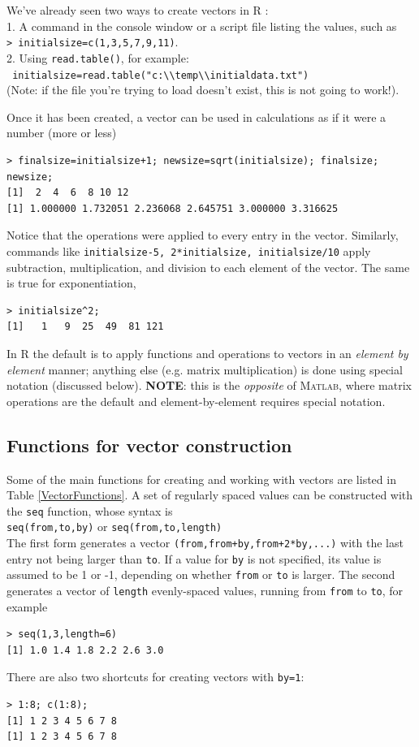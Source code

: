 \documentclass [11pt]{article}
\newcommand{\blst}{\vspace{-0.035in} \begin{lstlisting}}
\newcommand{\ttt}[1]{\texttt{#1}}
\numberwithin{exercise}{section}
\def\R{R }
\begin{document}
We've already seen two ways to create vectors in \R: \\
1. A command in the console window or a script file listing the values, 
such as \\
\hspace*{1in} \texttt{> initialsize=c(1,3,5,7,9,11)}.\\
2. Using \texttt{read.table()}, for example: \\  
\hspace*{1in} \verb! initialsize=read.table("c:\\temp\\initialdata.txt")! \\ (Note: if the file you're trying to load doesn't exist, this is not
going to work!).  

Once it has been created, a vector can be used in calculations as if it were a number (more or less) 
\blst
> finalsize=initialsize+1; newsize=sqrt(initialsize); finalsize; newsize; 
[1]  2  4  6  8 10 12
[1] 1.000000 1.732051 2.236068 2.645751 3.000000 3.316625
\end{lstlisting}

Notice that the operations were applied to every entry in the vector. 
Similarly, commands like \texttt{initialsize-5, 2*initialsize, initialsize/10} 
apply subtraction, multiplication, and division to each element of the 
vector. The same is true for exponentiation, 
\blst
> initialsize^2;
[1]   1   9  25  49  81 121
\end{lstlisting}

In \R the default is to apply functions and operations to vectors
in an \textit{element by element} manner; anything else (e.g. matrix
multiplication) is done using special notation (discussed below). 
\textbf{NOTE}: this is the \textit{opposite} of \textsc{Matlab},
where matrix operations are the default and element-by-element requires
special notation. 

\subsection*{Functions for vector construction}
Some of the main functions for creating and working with vectors are
listed in Table \ref{VectorFunctions}. 
A set of regularly spaced values can be constructed with the \texttt{seq}
function, whose syntax is \\
\hspace*{1in} \texttt{seq(from,to,by)} or \texttt{seq(from,to,length)} \\
The first form generates a vector \texttt{(from,from+by,from+2*by,...)}
with the last entry not being larger than \texttt{to}. If a value for
\ttt{by} is not specified, its value is assumed to be 1 or -1, depending on
whether \texttt{from} or \texttt{to} is larger. The second generates a vector
of \ttt{length} evenly-spaced values, running from \ttt{from} to \ttt{to}, for
example 
\blst
> seq(1,3,length=6)
[1] 1.0 1.4 1.8 2.2 2.6 3.0
\end{lstlisting}
There are also two shortcuts for creating vectors with \texttt{by=1}:
\blst
> 1:8; c(1:8);
[1] 1 2 3 4 5 6 7 8
[1] 1 2 3 4 5 6 7 8
\end{lstlisting}
\end{document}
